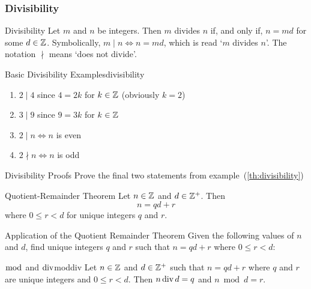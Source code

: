 \subsubsection{Divisibility}

\begin{definition}{Divisibility}{}
    Let $m$ and $n$ be integers. Then $m$ divides $n$ if, and only if, $n = md$ for some $d \in \mathbb Z$. Symbolically, $m \mid n \Leftrightarrow n = md$, which is read `$m$ divides $n$'. The notation $\nmid$ means `does not divide'.
\end{definition}

\begin{example}{Basic Divisibility Examples}{divisibility}
    \begin{enumerate}
        \item $2 \mid 4$ since $4 = 2k$ for $k \in \mathbb Z$ (obviously $k=2$)
        \item $3 \mid 9$ since $9 = 3k$ for $k \in \mathbb Z$
        \item $2 \mid n \Leftrightarrow n$ is even
        \item $2 \nmid n \Leftrightarrow n$ is odd
    \end{enumerate}
\end{example}

\begin{question}{Divisibility Proofs}{}
    Prove the final two statements from example~(\ref{th:divisibility})
\end{question}

\begin{thm}{Quotient-Remainder Theorem}
    Let $n \in \mathbb Z$ and $d \in \mathbb Z^{+}$. Then 
    \begin{equation*}
        n = qd + r
    \end{equation*}
    where $0 \leq r < d$ for unique integers $q$ and $r$.
\end{thm}

\begin{question}{Application of the Quotient Remainder Theorem}{}
    Given the following values of $n$ and $d$, find unique integers $q$ and $r$ such that $n = qd + r$ where $0 \leq r < d$:
    \begin{questions}
    \end{questions}
\end{question}

\begin{definition}{$\bmod$ and $\operatorname{div}$}{moddiv}
    Let $n \in \mathbb Z$ and $d \in \mathbb Z^{+}$ such that $n = qd + r$ where $q$ and $r$ are unique integers and $0 \leq r < d$. Then $n \operatorname{div} d = q$ and $n \bmod d = r$.
\end{definition}

